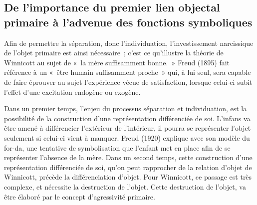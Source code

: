 \documentclass[12pt, a4paper]{book}
\begin{document}
\begin{spacing}{1.5}
\subsection{De l'importance du premier lien objectal primaire à l'advenue des fonctions symboliques}

Afin de permettre la séparation, donc l'individuation, l'investissement narcissique de l'objet primaire est ainsi nécessaire ; c'est ce qu'illustre la théorie de Winnicott au sujet de « la mère suffisamment bonne. » Freud (1895) fait référence à un « être humain suffisamment proche » qui, à lui seul, sera capable de faire éprouver au sujet l'expérience vécue de satisfaction, lorsque celui-ci subit l'effet d'une excitation endogène ou exogène.

Dans un premier temps, l'enjeu du processus séparation et individuation, est la possibilité de la construction d'une représentation différenciée de soi. L'infans va être amené à différencier l'extérieur de l'intérieur, il pourra se représenter l'objet seulement si celui-ci vient à manquer. Freud (1920) explique avec son modèle du for-da, une tentative de symbolisation que l'enfant met en place afin de se représenter l'absence de la mère. Dans un second temps, cette construction d'une représentation différenciée de soi, qu'on peut rapprocher de la relation d'objet de Winnicott, précède la différenciation d'objet. Pour Winnicott, ce passage est très complexe, et nécessite la destruction de l'objet. Cette destruction de l'objet, va être élaboré par le concept d'agressivité primaire.


\end{spacing}
\end{document}

